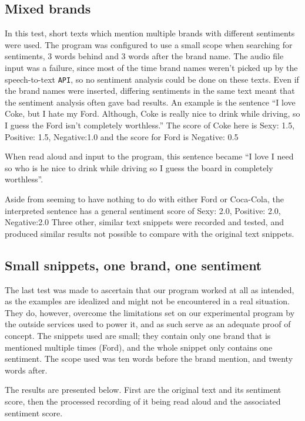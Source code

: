 \documentclass[a4paper,12pt,twoside]{ltxdoc}
\begin{document}
\subsection{Mixed brands}
In this test, short texts which mention multiple brands with different sentiments were used. The program was configured to use a small scope when searching for sentiments, 3 words behind and 3 words after the brand name. The audio file input was a failure, since most of the time brand names weren't picked up by the speech-to-text \verb#API#, so no sentiment analysis could be done on these texts. Even if the brand names were inserted, differing sentiments in the same text meant that the sentiment analysis often gave bad results. An example is the sentence ``I love Coke, but I hate my Ford. Although, Coke is really nice to drink while driving, so I guess the Ford isn't completely worthless.'' The score of Coke here is 
Sexy: 1.5, Positive: 1.5, Negative:1.0
and the score for Ford is
Negative: 0.5

When read aloud and input to the program, this sentence became ``I love I need so who is he nice to drink while driving so I guess the board in completely worthless''.

Aside from seeming to have nothing to do with either Ford or Coca-Cola, the interpreted sentence has a general sentiment score of 
Sexy: 2.0, Positive: 2.0, Negative:2.0
Three other, similar text snippets were recorded and tested, and produced similar results not possible to compare with the original text snippets.

\subsection{Small snippets, one brand, one sentiment}
The last test was made to ascertain that our program worked at all as intended, as the examples are idealized and might not be encountered in a real situation. They do, however, overcome the limitations set on our experimental program by the outside services used to power it, and as such serve as an adequate proof of concept. The snippets used are small; they contain only one brand that is mentioned multiple times (Ford), and the whole snippet only contains one sentiment. The scope used was ten words before the brand mention, and twenty words after.

The results are presented below. First are the original text and its sentiment score, then the processed recording of it being read aloud and the associated sentiment score.
\end{document}
